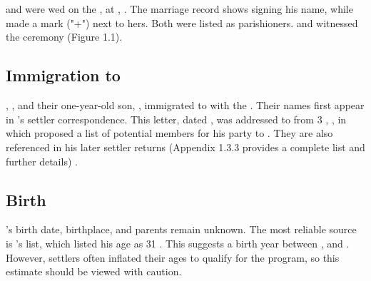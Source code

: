 \chapter[James McDonald]{\mcdonaldJName{}}
\label{ch1: James McDonald}

\section[Mary Welch]{\welchMName{}}
\label{sec: James McDonald and Mary Welch}

\mcdonaldJName{} and \welchMName{} were wed on the , at \stBotolphWithoutBishopsgate{}, \bishopsgateFull{} \autocite{FS:JamesMcDonaldMarriage} \autocite{settlers:JamesMcDonald}. The marriage record shows \mcdonaldJNameOnly{} signing his name, while \welchMNameOnly{} made a mark ("+") next to hers. Both were listed as parishioners. \nettoIName{} and \nettoCNameNee{} witnessed the ceremony (Figure 1.1).

\section[Immigration to South Africa]{{Immigration to \southAfrica{}}}
\label{sec: Immigration to South Africa}

\mcdonaldJNameOnly{}, \welchMNameOnly{}, and their one-year-old son, \mcdonaldANameOnly{}, immigrated to \southAfrica{} with the \settlersBritish{} \autocite[46]{nash:1820}. Their names first appear in \biggarAName{}'s settler correspondence. This letter, dated , was addressed to \bathhurstHName{} from 3 \northumberlandCourtFull{}, \london{}, in which \biggarASurname{} proposed a list of potential members for his party to \southAfrica \autocite[536-539]{eggsa:biggarCorrespondance}. They are also referenced in his later settler returns (Appendix 1.3.3 provides a complete list and further details) \autocite{eggsa:biggarReturn}.

\section[Birth]{Birth}
\label{sec: Birth}

\mcdonaldJNameOnly{}'s birth date, birthplace, and parents remain unknown. The most reliable source is \biggarASurname{}'s \settler{} list, which listed his age as 31 \autocite[536-539]{eggsa:biggarCorrespondance}. This suggests a birth year between , and . However, settlers often inflated their ages to qualify for the program, so this estimate should be viewed with caution.

